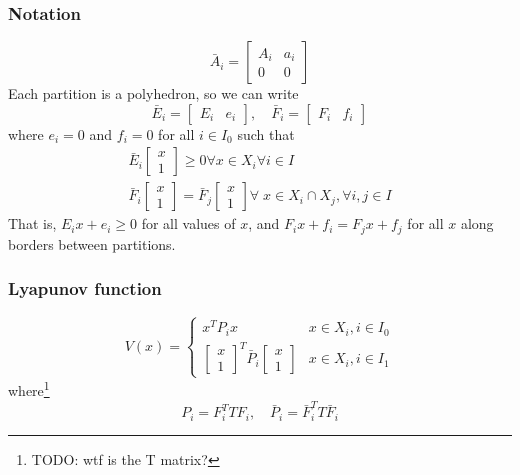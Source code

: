 \subsubsection{Notation}
\begin{equation}
  \bar{A}_i = \begin{bmatrix} A_i & a_i \\ 0 & 0 \end{bmatrix}
\end{equation}
%
Each partition is a polyhedron, so we can write
%
\begin{equation}
  \bar{E}_i = \begin{bmatrix} E_i & e_i \end{bmatrix}, \quad
  \bar{F}_i = \begin{bmatrix} F_i & f_i \end{bmatrix}
\end{equation}
%
where $e_i = 0$ and $f_i = 0$ for all $i \in I_0$ such that
%
\begin{gather}
  \bar{E}_i \begin{bmatrix} x \\ 1 \end{bmatrix} \geq 0 \forall x \in X_i \forall i \in I \\
  \bar{F}_i \begin{bmatrix} x \\ 1 \end{bmatrix} = \bar{F}_j \begin{bmatrix} x \\ 1 \end{bmatrix} \forall\; x \in X_i \cap X_j, \forall i, j \in I
\end{gather}
%
That is, $E_i x + e_i \geq 0$ for all values of $x$, and $F_i x + f_i = F_j x + f_j$ for all $x$ along borders between partitions.

\subsubsection{Lyapunov function}
\begin{equation}
  V(x) =
  \begin{cases}
    x^T P_i x & x \in X_i, i \in I_0 \\
    \begin{bmatrix} x \\ 1 \end{bmatrix}^T \bar{P}_i \begin{bmatrix} x \\ 1 \end{bmatrix} & x \in X_i, i \in I_1
  \end{cases}
\end{equation}
%
where\footnote{TODO: wtf is the T matrix?}
%
\begin{equation}\label{eq:pwa-lyapunov-matrix}
    P_i = F_i^T T F_i,\quad \bar{P}_i = \bar{F}_i^T T \bar{F}_i
\end{equation}

